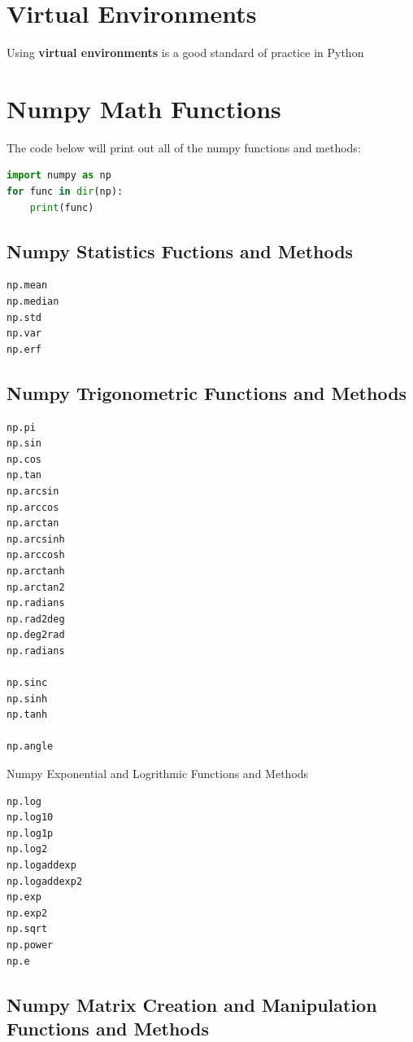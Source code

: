 \documentclass{book}
\begin{document}
    \section{Virtual Environments}\label{virtual-environments}

    Using \textbf{virtual environments} is a good standard of practice in
Python

    \section{Numpy Math Functions}\label{numpy-math-functions}

    The code below will print out all of the numpy functions and methods:

    \begin{lstlisting}[language=Python]
import numpy as np
for func in dir(np):
    print(func)
\end{lstlisting}

    \subsection{Numpy Statistics Fuctions and
Methods}\label{numpy-statistics-fuctions-and-methods}

    \begin{lstlisting}
np.mean
np.median
np.std
np.var
np.erf
\end{lstlisting}

    \subsection{Numpy Trigonometric Functions and
Methods}\label{numpy-trigonometric-functions-and-methods}

    \begin{lstlisting}
np.pi
np.sin
np.cos
np.tan
np.arcsin
np.arccos
np.arctan
np.arcsinh
np.arccosh
np.arctanh
np.arctan2
np.radians
np.rad2deg
np.deg2rad
np.radians

np.sinc
np.sinh
np.tanh

np.angle
\end{lstlisting}

    Numpy Exponential and Logrithmic Functions and Methods

    \begin{lstlisting}
np.log
np.log10
np.log1p
np.log2
np.logaddexp
np.logaddexp2
np.exp
np.exp2
np.sqrt
np.power
np.e
\end{lstlisting}

    \subsection{Numpy Matrix Creation and Manipulation Functions and
Methods}\label{numpy-matrix-creation-and-manipulation-functions-and-methods}
\end{document}
